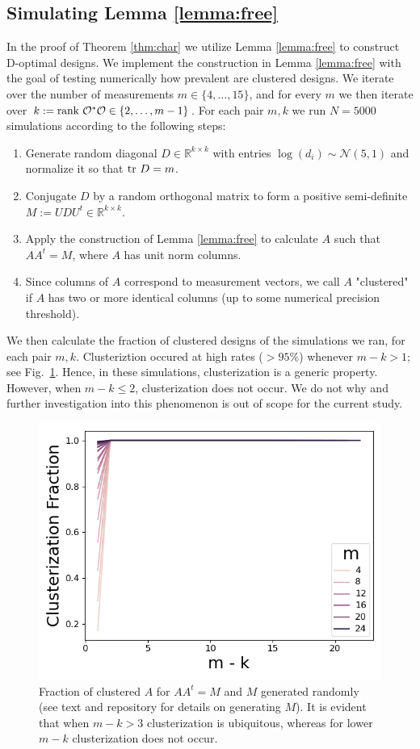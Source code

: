 \documentclass[ba]{imsart}
\newcommand{\obs}{\mathcal{O}}
\newcommand{\ttr}[1]{\textup{tr}\ #1}
\newcommand{\rank}{\textup{rank}\ }
\theoremstyle{plain}
\theoremstyle{definition}
\theoremstyle{remark}
\begin{document}
\subsection{Simulating Lemma \ref{lemma:free}}\label{subsec:lemma_sims}
In the proof of Theorem \ref{thm:char} we utilize Lemma
\ref{lemma:free} to construct D-optimal designs. We implement the
construction in Lemma \ref{lemma:free} with the goal of testing
numerically how prevalent are clustered designs. We iterate over the
number of measurements $m \in \{4,\dots, 15\}$, and for every $m$ we
then iterate over $k:=\rank \obs^*\obs \in \{2,\dots, m-1\}$. For each
pair $m,k$ we run $N=5000$ simulations according to the following
steps:
\begin{enumerate}
\item Generate random diagonal $D\in \mathbb{R}^{k\times k}$ with
  entries $\log (d_i) \sim \mathcal{N}(5,1)$ and normalize it so that
  $\ttr D = m$.
\item Conjugate $D$ by a random orthogonal matrix to form a positive
  semi-definite $M := UDU^t \in \mathbb{R}^{k\times k}$.
\item Apply the construction of Lemma \ref{lemma:free} to calculate
  $A$ such that $AA^t = M$, where $A$ has unit norm columns.
\item Since columns of $A$ correspond to measurement vectors, we call
  $A$ "clustered" if $A$ has two or more identical columns (up to some
  numerical precision threshold).
\end{enumerate}
We then calculate the fraction of clustered designs of the simulations
we ran, for each pair $m,k$. Clusteriztion occured at high rates
($>95\%$) whenever $m-k > 1$; see Fig.~\ref{fig:sim_AAt}. Hence, in
these simulations, clusterization is a generic property. However, when
$m-k \leq 2$, clusterization does not occur. We do not why and further
investigation into this phenomenon is out of scope for the current
study.

\begin{figure}
    \centering
    \includegraphics[height=0.5\textwidth]{figs/simulations.png}
    \caption{Fraction of clustered $A$ for $AA^t = M$ and $M$
      generated randomly (see text and repository for details on
      generating $M$). It is evident that when $m-k >3$ clusterization
      is ubiquitous, whereas for lower $m-k$ clusterization does not
      occur.}
  \label{fig:sim_AAt}
\end{figure}
\end{document}
